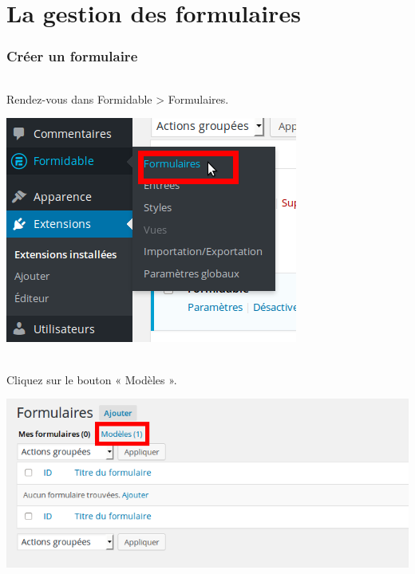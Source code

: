 \documentclass[10pt,a4paper]{article}
\begin{document}
\part{La gestion des formulaires}
\newpage

\section{Créer un formulaire}
\paragraph{}Rendez-vous dans Formidable > Formulaires.
\begin{center}
\includegraphics[scale=0.3]{img/0180.png}
\end{center}
\paragraph{}Cliquez sur le bouton « Modèles ».
\begin{center}
\includegraphics[scale=0.3]{img/0181.png}
\end{center}
\end{document}
